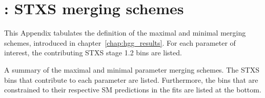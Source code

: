 \chapter{\Hgg: STXS merging schemes}\label{app:merging_table}
This Appendix tabulates the definition of the maximal and minimal merging schemes, introduced in chapter~\ref{chap:hgg_results}. For each parameter of interest, the contributing STXS stage 1.2 bins are listed. 

\begin{table}[htbp]
  \centering
  \scriptsize
  \renewcommand{\arraystretch}{1.1}
  \setlength{\tabcolsep}{2.2pt}
  \caption[Summary of the maximal and minimal parameter merging schemes]
  {
    A summary of the maximal and minimal parameter merging schemes. 
    The STXS bins that contribute to each parameter are listed. 
    Furthermore, the bins that are constrained to their respective SM predictions 
    in the fits are listed at the bottom.
  }
  \label{tab:merging_schemes}
  \hspace*{-1cm}
  
  \hspace*{-1cm}
\end{table}